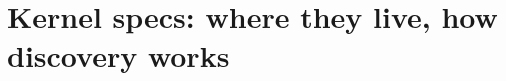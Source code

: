 \chapter{Kernel specs: where they live, how discovery works}
\label{ch:kernel-specs-where-they-live-how}

